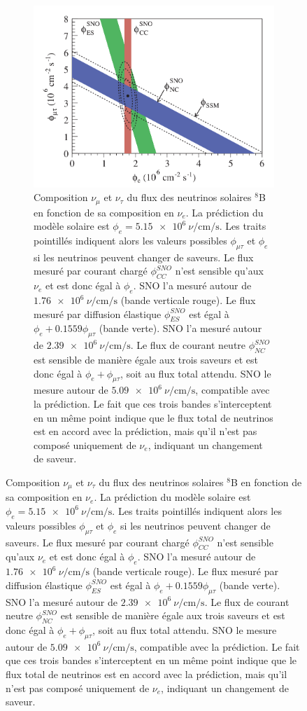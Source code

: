             \begin{figure}[htbp]
                \begin{subfigure}[t]{0.56\textwidth}
                    \includegraphics[width=\textwidth]{Chapitre_1/pictures/SNO_plot.png}
                    \caption{Composition $\nu_{\mu}$ et $\nu_{\tau}$ du flux des neutrinos solaires $^8$B en fonction de sa composition en $\nu_e$\cite{Aharmim2013}. La prédiction du modèle solaire est $\phi_{e}=\SI{5.15e6}{\nu\per\centi\meter\per\second}$. Les traits pointillés indiquent alors les valeurs possibles $\phi_{\mu\tau}$ et $\phi_e$ si les neutrinos peuvent changer de saveurs. Le flux mesuré par courant chargé $\phi_{CC}^{SNO}$ n'est sensible qu'aux $\nu_e$ et est donc égal à $\phi_{e}$. SNO l'a mesuré autour de $\SI{1.76e6}{\nu\per\centi\meter\per\second}$ (bande verticale rouge). Le flux mesuré par diffusion élastique $\phi_{ES}^{SNO}$ est égal à $\phi_{e}+0.1559\phi_{\mu\tau}$ (bande verte). SNO l'a mesuré autour de $\SI{2.39e6}{\nu\per\centi\meter\per\second}$. Le flux de courant neutre $\phi_{NC}^{SNO}$ est sensible de manière égale aux trois saveurs et est donc égal à $\phi_{e}+\phi_{\mu\tau}$, soit au flux total attendu. SNO le mesure autour de $\SI{5.09e6}{\nu\per\centi\meter\per\second}$, compatible avec la prédiction. Le fait que ces trois bandes s'interceptent en un même point indique que le flux total de neutrinos est en accord avec la prédiction, mais qu'il n'est pas composé uniquement de $\nu_e$, indiquant un changement de saveur.}
                    \label{fig::SNO_plot}
                \end{subfigure}
                \hfill 

\end{figure}
